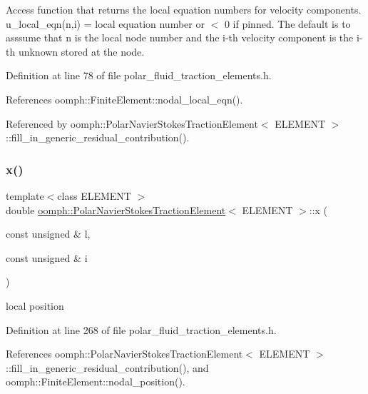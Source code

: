 Access function that returns the local equation numbers for velocity components. u\+\_\+local\+\_\+eqn(n,i) = local equation number or $<$ 0 if pinned. The default is to asssume that n is the local node number and the i-\/th velocity component is the i-\/th unknown stored at the node. 



Definition at line 78 of file polar\+\_\+fluid\+\_\+traction\+\_\+elements.\+h.



References oomph\+::\+Finite\+Element\+::nodal\+\_\+local\+\_\+eqn().



Referenced by oomph\+::\+Polar\+Navier\+Stokes\+Traction\+Element$<$ E\+L\+E\+M\+E\+N\+T $>$\+::fill\+\_\+in\+\_\+generic\+\_\+residual\+\_\+contribution().

\mbox{\label{classoomph_1_1PolarNavierStokesTractionElement_a9c89a9bed61686e2fb60717f133f8f02}} 
\subsubsection{\texorpdfstring{x()}{x()}}
{\footnotesize\ttfamily template$<$class E\+L\+E\+M\+E\+NT $>$ \\
double \hyperlink{classoomph_1_1PolarNavierStokesTractionElement}{oomph\+::\+Polar\+Navier\+Stokes\+Traction\+Element}$<$ E\+L\+E\+M\+E\+NT $>$\+::x (\begin{DoxyParamCaption}\item[{const unsigned \&}]{l,  }\item[{const unsigned \&}]{i }\end{DoxyParamCaption})\hspace{0.3cm}{\ttfamily [inline]}}



local position 



Definition at line 268 of file polar\+\_\+fluid\+\_\+traction\+\_\+elements.\+h.



References oomph\+::\+Polar\+Navier\+Stokes\+Traction\+Element$<$ E\+L\+E\+M\+E\+N\+T $>$\+::fill\+\_\+in\+\_\+generic\+\_\+residual\+\_\+contribution(), and oomph\+::\+Finite\+Element\+::nodal\+\_\+position().



